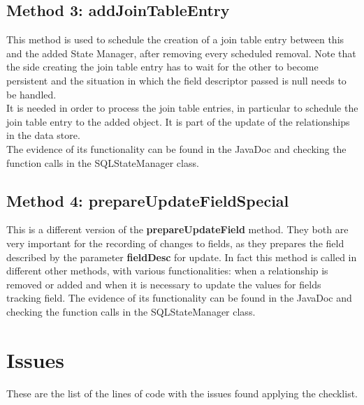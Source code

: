 \documentclass[18pt,oneside,a4paper, titlepage]{article}
\begin{document}
	\subsection{Method 3: addJoinTableEntry}
		This method is used to schedule the creation of a join table entry between this and the added State Manager, after removing every scheduled removal. Note that the side creating the join table entry has to wait for the other to become persistent and the situation in which the field descriptor passed is null needs to be handled.\\
		It is needed in order to process the join table entries, in particular to schedule the join table entry to the added object. It is part of the update of the relationships in the data store.\\
		The evidence of its functionality can be found in the JavaDoc and checking the function calls in the SQLStateManager class.
	\subsection{Method 4: prepareUpdateFieldSpecial}
		This is a different version of the \textbf{prepareUpdateField} method. They both are very important for the recording of changes to fields, as they prepares the field described by the parameter \textbf{fieldDesc} for update. In fact this method is called in different other methods, with various functionalities: when a relationship is removed or added and when it is necessary to update the values for fields tracking field.
		The evidence of its functionality can be found in the JavaDoc and checking the function calls in the SQLStateManager class.

\newpage
\section{Issues}
	These are the list of the lines of code with the issues found applying the checklist.
\end{document}
